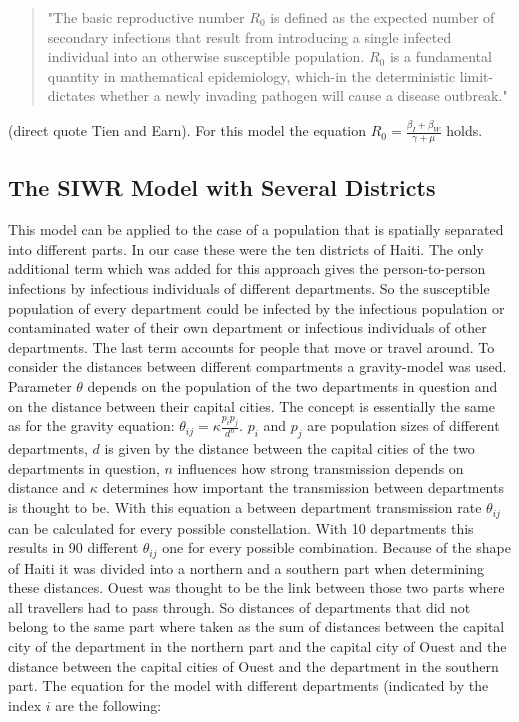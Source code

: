 \documentclass[11pt]{article}
\begin{document}
\begin{quotation}
"The basic reproductive number $ R_{0} $ is defined as the expected number of secondary infections that result from introducing a single infected individual into an otherwise susceptible population. $ R_{0} $ is a fundamental quantity in mathematical epidemiology, which-in the deterministic limit-dictates whether a newly invading pathogen will cause a disease outbreak."
\end{quotation}

(direct quote Tien and Earn). 
For this model the equation $ R_{0}=\frac{\beta_{I}+\beta_{W}}{\gamma+\mu} $ holds.

\subsection{The SIWR Model with Several Districts}
This model can be applied to the case of a population  that is spatially separated into different parts. In our case these were the ten districts of Haiti. The only additional term which was added for this approach gives the person-to-person infections by infectious individuals of different departments. So the susceptible population of every department could be infected by the infectious population or contaminated water of their own department or infectious individuals of other departments. The last term accounts for people that move or travel around. To consider the distances between different compartments a gravity-model was used. Parameter $ \theta $ depends on the population of the two departments in question and on the distance between their capital cities. The concept is essentially the same as for the gravity equation: $ \theta_{ij}=\kappa\frac{p_{i}p_{j}}{d^{n}} $. $ p_{i} $ and $ p_{j} $ are population sizes of different departments, $ d $ is given by the distance between the capital cities of the two departments in question, $ n $ influences how strong transmission depends on distance and $ \kappa $ determines how important the transmission between departments is thought to be. With this equation a between department transmission rate $ \theta_{ij} $ can be calculated for every possible constellation. With 10 departments this results in 90 different $ \theta_{ij} $ one for every possible combination. Because of the shape of Haiti it was divided into a northern and a southern part when determining these distances. Ouest was thought to be the link between those two parts where all travellers had to pass through. So distances of departments that did not belong to the same part where taken as the sum of distances between the capital city of the department in the northern part and the capital city of Ouest and the distance between the capital cities of Ouest and the department in the southern part.
The equation for the model with different departments (indicated by the index $ i $ are the following:
\end{document}
